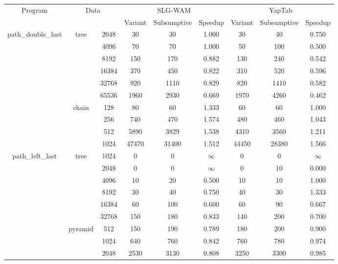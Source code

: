 \begin{table}
\scriptsize{
\begin{tabular}{c|c|c|c|c|c|c|c|c}
   \hline
   \multirow{2}{*}{Program} & \multicolumn{2}{c|}{\multirow{2}{*}{Data}} & \multicolumn{3}{c|}{SLG-WAM} & \multicolumn{3}{c}{YapTab} \\ \cline{4-6} \cline{7-9}
   & \multicolumn{2}{c|}{} & Variant & Subsumptive & Speedup & Variant & Subsumptive & Speedup \\ \hline
   \multirow{10}{*}{path\_double\_last} &  \multirow{6}{*}{tree} &  2048 &  30 & 30 &  1.000  & 30 & 40 &  0.750 \\
   &  &  4096 &  70 & 70 &  1.000  & 50 & 100 &  0.500 \\
   &  &  8192 &  150 & 170 &  0.882  & 130 & 240 &  0.542 \\
   &  &  16384 &  370 & 450 &  0.822  & 310 & 520 &  0.596 \\
   &  &  32768 &  920 & 1110 &  0.829  & 820 & 1410 &  0.582 \\
   &  &  65536 &  1960 & 2930 &  0.669  & 1970 & 4260 &  0.462 \\
   \cline{2-9}
   &  \multirow{4}{*}{chain} &  128 &  80 & 60 &  1.333  & 60 & 60 &  1.000 \\
   &  &  256 &  740 & 470 &  1.574  & 480 & 460 &  1.043 \\
   &  &  512 &  5890 & 3829 &  1.538  & 4310 & 3560 &  1.211 \\
   &  &  1024 &  47470 & 31400 &  1.512  & 44450 & 28380 &  1.566 \\
   \cline{2-9}
   \hline
   \multirow{20}{*}{path\_left\_last} &  \multirow{6}{*}{tree} &  1024 &  0 & 0 &  $\infty$  & 0 & 0 &  $\infty$ \\
   &  &  2048 &  0 & 0 &  $\infty$  & 0 & 10 &  0.000 \\
   &  &  4096 &  10 & 20 &  0.500  & 10 & 10 &  1.000 \\
   &  &  8192 &  30 & 40 &  0.750  & 40 & 30 &  1.333 \\
   &  &  16384 &  60 & 100 &  0.600  & 60 & 90 &  0.667 \\
   &  &  32768 &  150 & 180 &  0.833  & 140 & 200 &  0.700 \\
   \cline{2-9}
   &  \multirow{4}{*}{pyramid} &  512 &  150 & 190 &  0.789  & 180 & 200 &  0.900 \\
   &  &  1024 &  640 & 760 &  0.842  & 760 & 780 &  0.974 \\
   &  &  2048 &  2530 & 3130 &  0.808  & 3250 & 3300 &  0.985 \\

\end{tabular}}
\end{table}
